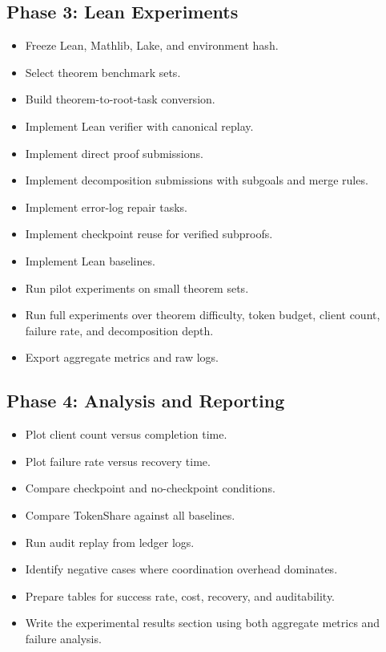 \documentclass{article}
\theoremstyle{plain}
\begin{document}
\subsection{Phase 3: Lean Experiments}

\begin{itemize}[leftmargin=*]
  \item Freeze Lean, Mathlib, Lake, and environment hash.
  \item Select theorem benchmark sets.
  \item Build theorem-to-root-task conversion.
  \item Implement Lean verifier with canonical replay.
  \item Implement direct proof submissions.
  \item Implement decomposition submissions with subgoals and merge rules.
  \item Implement error-log repair tasks.
  \item Implement checkpoint reuse for verified subproofs.
  \item Implement Lean baselines.
  \item Run pilot experiments on small theorem sets.
  \item Run full experiments over theorem difficulty, token budget, client count, failure rate, and decomposition depth.
  \item Export aggregate metrics and raw logs.
\end{itemize}

\subsection{Phase 4: Analysis and Reporting}

\begin{itemize}[leftmargin=*]
  \item Plot client count versus completion time.
  \item Plot failure rate versus recovery time.
  \item Compare checkpoint and no-checkpoint conditions.
  \item Compare TokenShare against all baselines.
  \item Run audit replay from ledger logs.
  \item Identify negative cases where coordination overhead dominates.
  \item Prepare tables for success rate, cost, recovery, and auditability.
  \item Write the experimental results section using both aggregate metrics and failure analysis.
\end{itemize}
\end{document}

